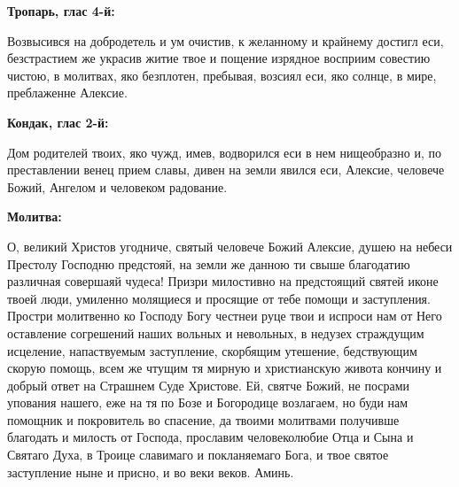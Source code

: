  



\bigskip\bigskip\mychapterending

 
\bfseries Тропарь, глас 4-й:\normalfont{}


Возвысився на добродетель и ум очистив, к желанному и крайнему достигл еси, безстрастием же украсив житие твое и пощение изрядное восприим совестию чистою, в молитвах, яко безплотен, пребывая, возсиял еси, яко солнце, в мире, преблаженне Алексие.


\medskip
\bfseries Кондак, глас 2-й:\normalfont{}


Дом родителей твоих, яко чужд, имев, водворился еси в нем нищеобразно и, по преставлении венец прием славы, дивен на земли явился еси, Алексие, человече Божий, Ангелом и человеком радование.


\medskip
\bfseries Молитва:\normalfont{}


О, великий Христов угодниче, святый человече Божий Алексие, душею на небеси Престолу Господню предстояй, на земли же данною ти свыше благодатию различная совершаяй чудеса! Призри милостивно на предстоящий святей иконе твоей люди, умиленно молящиеся и просящие от тебе помощи и заступления. Простри молитвенно ко Господу Богу честнеи руце твои и испроси нам от Него оставление согрешений наших вольных и невольных, в недузех страждущим исцеление, напаствуемым заступление, скорбящим утешение, бедствующим скорую помощь, всем же чтущим тя мирную и христианскую живота кончину и добрый ответ на Страшнем Суде Христове. Ей, святче Божий, не посрами упования нашего, еже на тя по Бозе и Богородице возлагаем, но буди нам помощник и покровитель во спасение, да твоими молитвами получивше благодать и милость от Господа, прославим человеколюбие Отца и Сына и Святаго Духа, в Троице славимаго и покланяемаго Бога, и твое святое заступление ныне и присно, и во веки веков. Аминь.


\bigskip\bigskip\mychapterending

 


